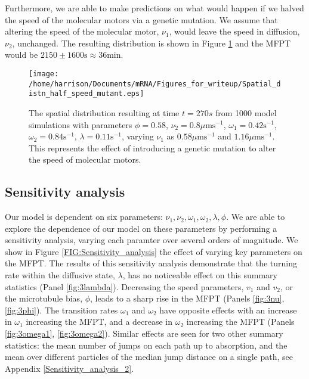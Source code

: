 \documentclass[twocolumn]{biophys}
\begin{document}
Furthermore, we are able to make predictions on what would happen if we halved the speed of the molecular motors via a genetic mutation.
We assume that altering the speed of the molecular motor, $\nu_1$, would leave the speed in diffusion, $\nu_2$, unchanged.
The resulting distribution is shown in Figure \ref{FIG:Half_speed_q} and the MFPT would be $2150\pm1600 \text{s} \approx 36\text{min}$.
\begin{figure}[h]
 \centering
 \texttt{[image: /home/harrison/Documents/mRNA/Figures\_for\_writeup/Spatial\_distn\_half\_speed\_mutant.eps]}
 \caption{\small The spatial distribution resulting at time $t=270s$ from 1000 model simulations with parameters $\phi=0.58$, $\nu_2=0.8 \mu \text{ms}^{-1}$, $\omega_1=0.42 \text{s}^{-1}$, $\omega_2=0.84 \text{s}^{-1}$, $\lambda=0.11 \text{s}^{-1}$, varying $\nu_1$ as $0.58\mu \text{ms}^{-1}$ and $1.16\mu \text{ms}^{-1}$. 
 This represents the effect of introducing a genetic mutation to alter the speed of molecular motors.}
 \label{FIG:Half_speed_q}
\end{figure}

\subsection{Sensitivity analysis}
Our model is dependent on six parameters: $\nu_1, \nu_2, \omega_1, \omega_2, \lambda, \phi$. 
We are able to explore the dependence of our model on these parameters by performing a sensitivity analysis, varying each paramter over several orders of magnitude.
We show  in Figure \ref{FIG:Sensitivity_analysis} the effect of varying key parameters on the MFPT.
The results of this sensitivity analysis demonstrate that the turning rate within the diffusive state, $\lambda$, has no noticeable effect on this summary statistics (Panel \ref{fig:3lambda}).
Decreasing the speed parameters, $v_1$ and $v_2$, or the microtubule bias, $\phi$, leads to a sharp rise in the MFPT (Panels \ref{fig:3nu}, \ref{fig:3phi}). 
The transition rates $\omega_1$ and $\omega_2$ have opposite effects with an increase in $\omega_1$ increasing the MFPT, and a decrease in $\omega_2$ increasing the MFPT (Panels \ref{fig:3omega1}, \ref{fig:3omega2}). 
Similar effects are seen for two other summary statistics: the mean number of jumps on each path up to absorption, and the mean over different particles of the median jump distance on a single path, see Appendix \ref{Sensitivity_analysis_2}.
\end{document}
